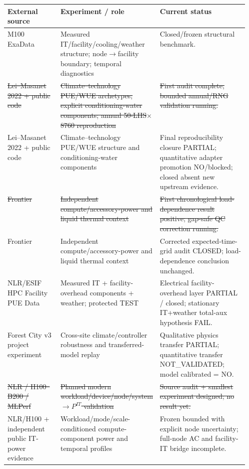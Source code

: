\documentclass[11pt]{article}
\newcommand{\oldtxt}[1]{\textcolor{blue!70!black}{\sout{#1}}}
\newcommand{\newtxt}[1]{\textcolor{green!45!black}{#1}}
\newcommand{\latesttxt}[1]{\textcolor{purple!85!black}{#1}}
\begin{document}
\begin{center}
\scriptsize
\begin{tabularx}{\linewidth}{@{}p{0.22\linewidth}p{0.34\linewidth}Y@{}}
\toprule
\textbf{External source} & \textbf{Experiment / role} & \textbf{Current status} \\
\midrule
\newtxt{M100 ExaData \cite{m100exadata}} & \newtxt{Measured IT/facility/cooling/weather structure; node\(\rightarrow\)facility boundary; temporal diagnostics} & \newtxt{Closed/frozen structural benchmark.} \\
\oldtxt{Lei--Masanet 2022 + public code \cite{lei2022}} & \oldtxt{Climate--technology PUE/WUE archetypes; explicit conditioning-water components; annual 50-LHS\(\times\)8760 reproduction} & \oldtxt{First audit complete; bounded annual/RNG validation running.} \\
\latesttxt{Lei--Masanet 2022 + public code \cite{lei2022}} & \latesttxt{Climate--technology PUE/WUE structure and conditioning-water components} & \latesttxt{Final reproducibility closure PARTIAL; quantitative adapter promotion NO/blocked; closed absent new upstream evidence.} \\
\oldtxt{Frontier \cite{frontier2024}} & \oldtxt{Independent compute/accessory-power and liquid thermal context} & \oldtxt{First chronological load-dependence result positive; gap-safe QC correction running.} \\
\latesttxt{Frontier \cite{frontier2024}} & \latesttxt{Independent compute/accessory-power and liquid thermal context} & \latesttxt{Corrected expected-time-grid audit CLOSED; load-dependence conclusion unchanged.} \\
\latesttxt{NLR/ESIF HPC Facility PUE Data \cite{esifdata}} & \latesttxt{Measured IT + facility-overhead components + weather; protected TEST} & \latesttxt{Electrical facility-overhead layer PARTIAL / closed; stationary IT+weather total-aux hypothesis FAIL.} \\
\latesttxt{Forest City v3 project experiment} & \latesttxt{Cross-site climate/controller robustness and transferred-model replay} & \latesttxt{Qualitative physics transfer PARTIAL; quantitative transfer NOT\_VALIDATED; model calibrated = NO.} \\
\oldtxt{NLR / H100--B200 / MLPerf} & \oldtxt{Planned modern workload/device/node/system \(\rightarrow P^{IT}\) validation} & \oldtxt{Source audit + smallest experiment designed; no result yet.} \\
\latesttxt{NLR/H100 + independent public IT-power evidence} & \latesttxt{Workload/mode/scale-conditioned compute-component power and temporal profiles} & \latesttxt{Frozen bounded with explicit node uncertainty; full-node AC and facility-IT bridge incomplete.} \\
\bottomrule
\end{tabularx}
\end{center}
\end{document}
